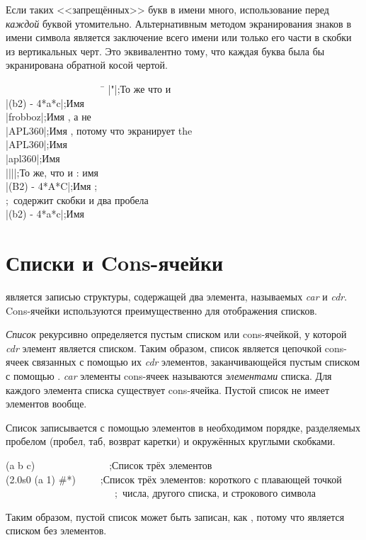 Если таких <<запрещённых>> букв в имени много, использование \cd{{\Xbackslash}}
перед \emph{каждой} буквой утомительно. Альтернативным методом экранирования 
знаков в имени символа является заключение всего имени или только его части в
скобки из вертикальных черт. Это эквивалентно тому, что каждая буква была бы
экранирована обратной косой чертой.
\begin{lisp}
~~~~~~~~~~~~~~~~~~~~\=\kill
|"|\>;\textrm{То же что и } \\
|(b{\Xcircumflex}2) - 4*a*c|\>;\textrm{Имя } \\
|frobboz|\>;\textrm{Имя , а не } \\
|APL{\Xbackslash}360|\>;\textrm{Имя , потому что \cd{{\Xbackslash}} экранирует the } \\
|APL{\Xbackslash}{\Xbackslash}360|\>;\textrm{Имя } \\
|apl{\Xbackslash}{\Xbackslash}360|\>;\textrm{Имя } \\
|{\Xbackslash}|{\Xbackslash}||\>;\textrm{То же, что и \cd{{\Xbackslash}|{\Xbackslash}|}: имя \cd{||}} \\
|(B{\Xcircumflex}2) - 4*A*C|\>;\textrm{Имя ;} \\
\>;~\textrm{содержит скобки и два пробела} \\
|(b{\Xcircumflex}2) - 4*a*c|\>;\textrm{Имя }
\end{lisp}

\section{Списки и Cons-ячейки}

 является записью структуры, содержащей два элемента, называемых
\emph{car} и \emph{cdr}. Cons-ячейки используются преимущественно для отображения
списков.

\emph{Список} рекурсивно определяется пустым списком или cons-ячейкой, у
которой \emph{cdr} элемент является списком.
Таким образом, список является цепочкой cons-ячеек связанных с помощью их
\emph{cdr} элементов, заканчивающейся пустым списком с помощью
{\nil}. \emph{car} элементы cons-ячеек называются \emph{элементами} списка. Для
каждого элемента списка существует cons-ячейка. Пустой список не имеет элементов
вообще.

Список записывается с помощью элементов в необходимом порядке, разделяемых
пробелом (пробел, таб, возврат каретки) и окружённых круглыми скобками.
\begin{lisp}
(a b c)~~~~~~~~~~~~~~~;\textrm{Список трёх элементов} \\
(2.0s0 (a 1) \#{\Xbackslash}*)~~~~~;\textrm{Список трёх элементов: короткого с
  плавающей точкой} \\
~~~~~~~~~~~~~~~~~~~~~~;~\textrm{числа, другого списка, и строкового символа}
\end{lisp}
Таким образом, пустой список {\nil} может быть записан, как {\emptylist}, потому что
является списком без элементов.

